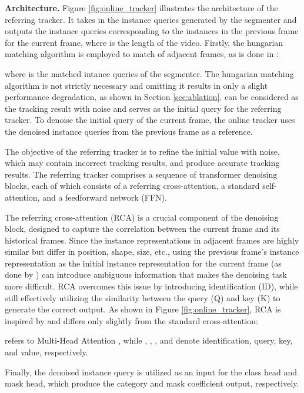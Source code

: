 \documentclass[10pt,twocolumn,letterpaper]{article}
\begin{document}
\textbf{Architecture.} Figure \ref{fig:online_tracker} illustrates the architecture of the referring tracker. It takes in the instance queries  generated by the segmenter and outputs the instance queries  corresponding to the instances in the previous frame for the current frame, where  is the length of the video. Firstly, the hungarian matching algorithm \cite{hungarian} is employed to match  of adjacent frames, as is done in \cite{minvis}:

where  is the matched intance queries of the segmenter. The hungarian matching algorithm is not strictly necessary and omitting it results in only a slight performance degradation, as shown in Section \ref{sec:ablation}.  can be considered as the tracking result with noise and serves as the initial query for the referring tracker. To denoise the initial query  of the current frame, the online tracker uses the denoised instance queries  from the previous frame as a reference.

The objective of the referring tracker is to refine the initial value with noise, which may contain incorrect tracking results, and produce accurate tracking results. The referring tracker comprises a sequence of  transformer denoising blocks, each of which consists of a referring cross-attention, a standard self-attention, and a feedforward network (FFN).

The referring cross-attention (RCA) is a crucial component of the denoising block, designed to capture the correlation between the current frame and its historical frames. Since the instance representations in adjacent frames are highly similar but differ in position, shape, size, etc., using the previous frame's instance representation as the initial instance representation for the current frame (as done by \cite{rovis, genvis}) can introduce ambiguous information that makes the denoising task more difficult. RCA overcomes this issue by introducing identification (ID), while still effectively utilizing the similarity between the query (Q) and key (K) to generate the correct output. As shown in Figure \ref{fig:online_tracker}, RCA is inspired by \cite{referring} and differs only slightly from the standard cross-attention:

 refers to Multi-Head Attention \cite{transformer}, while , , , and  denote identification, query, key, and value, respectively. 

Finally, the denoised instance query  is utilized as an input for the class head and mask head, which produce the category and mask coefficient output, respectively.
\end{document}

